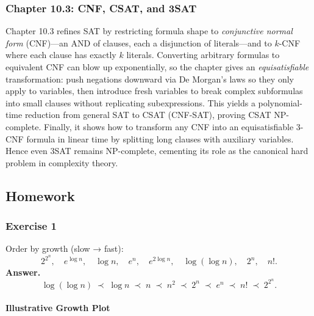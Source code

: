 \documentclass{article}
\begin{document}
\subsubsection{Chapter 10.3: CNF, CSAT, and 3SAT}
Chapter 10.3 refines SAT by restricting formula shape to \emph{conjunctive normal form} (CNF)—an AND of clauses, each a disjunction of literals—and to $k$-CNF where each clause has exactly $k$ literals.  Converting arbitrary formulas to equivalent CNF can blow up exponentially, so the chapter gives an \emph{equisatisfiable} transformation: push negations downward via De Morgan’s laws so they only apply to variables, then introduce fresh variables to break complex subformulas into small clauses without replicating subexpressions.  This yields a polynomial-time reduction from general SAT to CSAT (CNF-SAT), proving CSAT NP-complete.  Finally, it shows how to transform any CNF into an equisatisfiable 3-CNF formula in linear time by splitting long clauses with auxiliary variables.  Hence even 3SAT remains NP-complete, cementing its role as the canonical hard problem in complexity theory.

\subsection{Homework}

\subsubsection{Exercise 1}
Order by growth (slow → fast):
\[
2^{2^n},\quad e^{\log n},\quad \log n,\quad e^n,\quad
e^{2\log n},\quad \log(\log n),\quad 2^n,\quad n!.
\]
\textbf{Answer.}
\[
\log(\log n)\;\prec\;\log n\;\prec\;n\;\prec\;n^2\;\prec\;2^n\;\prec\;e^n\;\prec\;n!\;\prec\;2^{2^n}.
\]

\paragraph{Illustrative Growth Plot}
\begin{center}
\end{center}
\end{document}
